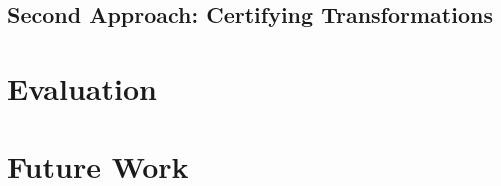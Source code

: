 \documentclass[
	msc,
	english
]{ppgccufmg}
\begin{document}
    \section{Second Approach: Certifying Transformations}
    
	\chapter{Evaluation}
	\chapter{Future Work}

		
		
\end{document}
